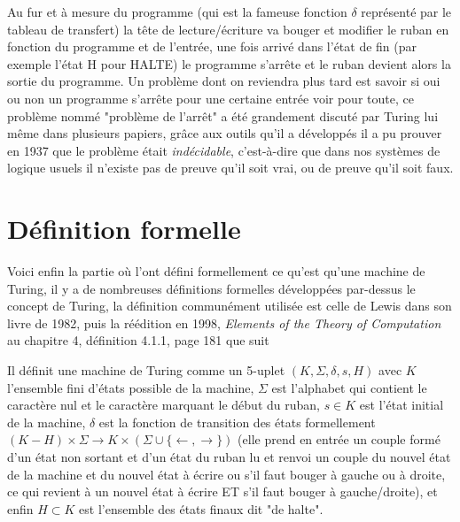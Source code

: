 \documentclass[colorlinks]{article}
\begin{document}
    Au fur et à mesure du programme (qui est la fameuse fonction $\delta$ représenté par le tableau de transfert) la tête de lecture/écriture 
    va bouger et modifier le ruban en fonction du programme et de l'entrée, une fois arrivé dans l'état de fin (par exemple l'état H pour HALTE)
    le programme s'arrête et le ruban devient alors la sortie du programme. Un problème dont on reviendra plus tard est savoir si oui ou non 
    un programme s'arrête pour une certaine entrée voir pour toute, ce problème nommé "problème de l'arrêt" a été grandement discuté par Turing lui même 
    dans plusieurs papiers, grâce aux outils qu'il a développés il a pu prouver en 1937 que le problème était \textit{indécidable}, c'est-à-dire que dans nos systèmes de logique usuels il n'existe pas de preuve qu'il soit vrai, 
    ou de preuve qu'il soit faux. \cite{arret}

\cleardoublepage
\section{Définition formelle}
Voici enfin la partie où l'ont défini formellement ce qu'est qu'une machine de Turing, il y a de nombreuses définitions formelles 
développées par-dessus le concept de Turing, la définition communément utilisée est celle de Lewis dans son livre de 1982, puis la 
réédition en 1998, \textit{Elements of the Theory of Computation} au chapitre 4, définition 4.1.1, page 181 \cite{elements} que suit\newline


Il définit une machine de Turing 
comme un 5-uplet $(K,\Sigma,\delta,s,H)$ avec $K$ l'ensemble fini d'états possible de la machine, $\Sigma$ est l'alphabet qui contient 
le caractère nul et le caractère marquant le début du ruban, $s \in K$ est l'état initial de la machine, $\delta$ est la fonction 
de transition des états formellement $(K - H) \times \Sigma \to K \times (\Sigma \cup \{\leftarrow,\rightarrow\})$
(elle prend en entrée un couple formé d'un état non sortant et d'un état du ruban lu et 
renvoi un couple du nouvel état de la machine et du nouvel état à écrire ou s'il faut bouger à gauche ou à droite, ce qui 
revient à un nouvel état à écrire ET s'il faut bouger à gauche/droite), et enfin $H \subset K$ est l'ensemble des états 
finaux dit "de halte".\newline
\end{document}
